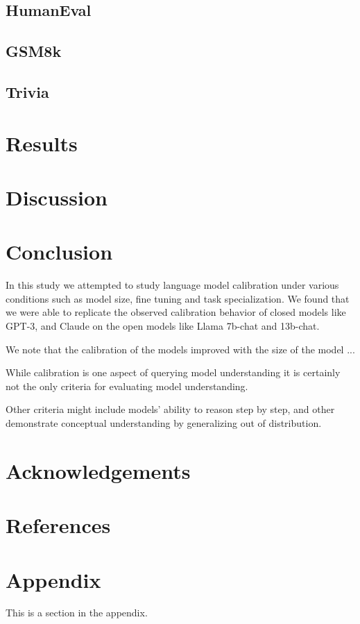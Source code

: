 \documentclass[11pt]{article}
\begin{document}
\subsection{HumanEval}

\subsection{GSM8k}

\subsection{Trivia}


\section{Results}

\section{Discussion}

\section{Conclusion}

In this study we attempted to study language model calibration 
under various conditions such as model size, fine tuning and  
task specialization. We found that we were able to replicate the 
observed  calibration behavior of closed models like GPT-3, and 
Claude on the open models like Llama 7b-chat and 13b-chat. 

We note that the calibration of the models  improved with the size 
of the model ...

While calibration is one aspect of querying model understanding it is 
certainly  not the only criteria for evaluating model understanding.  

Other criteria might include models' ability to reason step by step, 
and other demonstrate conceptual understanding by generalizing 
out of distribution. 

\section{Acknowledgements}

\section{References}




\appendix

\section{Appendix}
\label{sec:appendix}

This is a section in the appendix.
\end{document}
